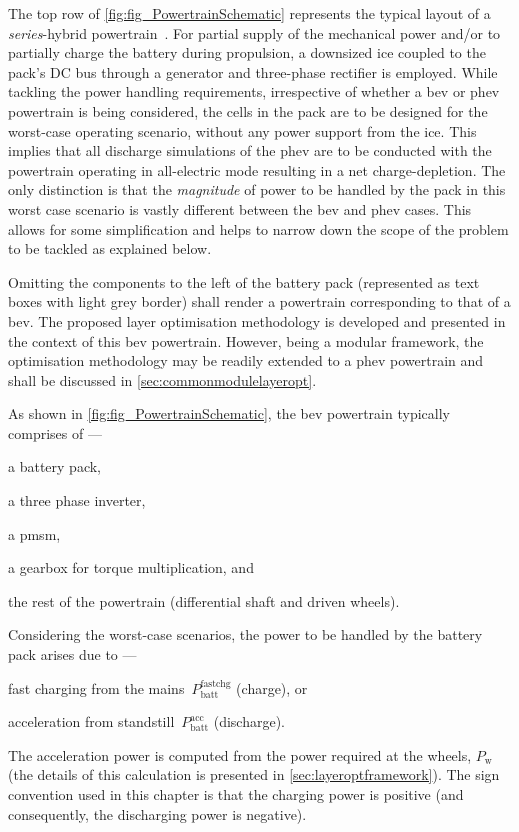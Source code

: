The top row of  \cref{fig:fig_PowertrainSchematic} represents the typical layout
of a \emph{series}-hybrid powertrain~\cite{Emadi2017}. For partial supply of the
mechanical  power and/or  to  partially charge  the  battery during  propulsion,
a  downsized  \gls{ice}  coupled  to  the pack's  DC  bus  through  a  generator
and  three-phase  rectifier  is  employed. While  tackling  the  power  handling
requirements, irrespective  of whether a  \gls{bev} or \gls{phev}  powertrain is
being considered, the  cells in the pack  are to be designed  for the worst-case
operating  scenario,  \ie{}  without  any  power  support  from  the  \gls{ice}.
This  implies  that all  discharge  simulations  of  the  \gls{phev} are  to  be
conducted with the powertrain operating in  all-electric mode resulting in a net
charge-depletion. The only distinction is  that the \emph{magnitude} of power to
be handled by the  pack in this worst case scenario  is vastly different between
the  \gls{bev} and  \gls{phev} cases.  This allows  for some  simplification and
helps to narrow down the scope of the problem to be tackled as explained below.

Omitting the  components to the  left of the  battery pack (represented  as text
boxes with light grey border) shall render a powertrain corresponding to that of
a  \gls{bev}.  The proposed  layer  optimisation  methodology is  developed  and
presented in the context of this  \gls{bev} powertrain. However, being a modular
framework, the optimisation methodology may  be readily extended to a \gls{phev}
powertrain and shall be discussed in \cref{sec:commonmodulelayeropt}.

As  shown   in  \cref{fig:fig_PowertrainSchematic},  the   \gls{bev}  powertrain
typically comprises of ---
\begin{enumerate*}[label=\itshape\alph*\upshape)]
    \item a battery pack,
    \item a three phase inverter,
    \item a \gls{pmsm},
    \item a gearbox for  torque multiplication, and
    \item the rest of the  powertrain  (differential shaft  and driven  wheels).
\end{enumerate*}
Considering the  worst-case scenarios, the  power to  be handled by  the battery
pack arises due to  ---
\begin{enumerate*}[label=\roman*)]
    \item fast charging from  the mains~$P^\text{fastchg}_\text{batt}$ (charge), or
    \item acceleration  from standstill~$P^\text{acc}_\text{batt}$ (discharge).
\end{enumerate*}
The   acceleration  power   is  computed   from  the   power  required   at  the
wheels,  $P_\text{w}$  (the   details  of  this  calculation   is  presented  in
\cref{sec:layeroptframework}). The sign convention used  in this chapter is that
the  charging power  is positive  (and  consequently, the  discharging power  is
negative).

